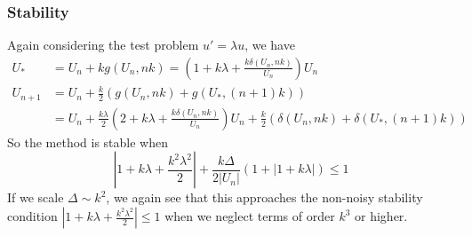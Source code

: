 \documentclass[letterpaper,11pt]{article}
\newcommand*{\abs}[1]{\left| #1 \right|}
\begin{document}
\begin{flushleft}
    \subsubsection{Stability}
    Again considering the test problem $u' = \lambda u$, we have
    \begin{align*}
        U_* &= U_n + kg(U_n, nk) = \left(1 + k\lambda + \frac{k\delta(U_n, nk)}{U_n}\right)U_n \\
        U_{n+1} &= U_n + \frac{k}{2}\left(g(U_n, nk) + g(U_*, (n+1)k)\right) \\
        &= U_n + \frac{k\lambda}{2}\left(2 + k\lambda + \frac{k\delta(U_n, nk)}{U_n}\right)U_n + \frac{k}{2}\left(\delta(U_n, nk) + \delta(U_*, (n+1)k)\right)
    \end{align*}
    So the method is stable when
    $$\boxed{\abs{1 + k\lambda + \frac{k^2\lambda^2}{2}} + \frac{k\Delta}{2\abs{U_n}}\left(1 + \abs{1 + k\lambda}\right) \leq 1}$$
    If we scale $\Delta \sim k^2$, we again see that this approaches the non-noisy stability condition $\abs{1 + k\lambda + \frac{k^2\lambda^2}{2}} \leq 1$ when we neglect terms of order $k^3$ or higher.

\end{flushleft}
\end{document}
